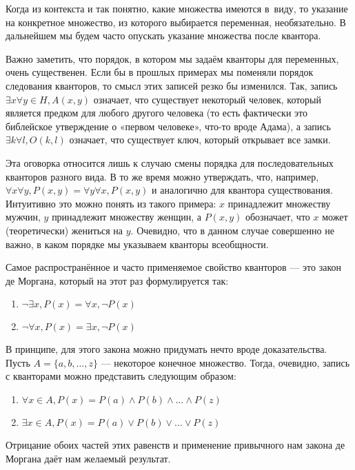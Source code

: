 Когда из контекста и так понятно, какие множества имеются в~виду, то указание на конкретное множество, из которого выбирается переменная, необязательно. В дальнейшем мы будем часто опускать указание множества после квантора.

Важно заметить, что порядок, в котором мы задаём кванторы для переменных, очень существенен. Если бы в прошлых примерах мы поменяли порядок следования кванторов, то смысл этих записей резко бы изменился. Так, запись $\exists x \forall y \in H, A(x, y)$ означает, что существует некоторый человек, который является предком для любого другого человека (то есть фактически это библейское утверждение о «первом человеке», что-то вроде Адама), а запись $\exists k \forall l, O(k, l)$ означает, что существует ключ, который открывает все замки.

Эта оговорка относится лишь к случаю смены порядка для последовательных кванторов разного вида. В то же время можно утверждать, что, например, $\forall x \forall y, P(x, y) = \forall y \forall x, P(x, y)$ и аналогично для квантора существования. Интуитивно это можно понять из такого примера: $x$ принадлежит множеству мужчин, $y$ принадлежит множеству женщин, а $P(x, y)$ обозначает, что $x$ может (теоретически) жениться на $y$. Очевидно, что в данном случае совершенно не важно, в каком порядке мы указываем кванторы всеобщности.

Самое распространённое и часто применяемое свойство кванторов — это закон де Моргана, который на этот раз формулируется так:

\begin{enumerate}
\item   $\neg \exists x, P(x) = \forall x, \neg P(x)$
\item   $\neg \forall x, P(x) = \exists x, \neg P(x)$
\end{enumerate}

В принципе, для этого закона можно придумать нечто вроде доказательства. Пусть $A = \{a, b, \ldots, z\}$ — некоторое конечное множество. Тогда, очевидно, запись с кванторами можно представить  следующим образом:

\begin{enumerate}
\item   $\forall x \in A, P(x) = P(a) \wedge P(b) \wedge \ldots \wedge P(z)$
\item   $\exists x \in A, P(x) = P(a) \vee P(b) \vee \ldots \vee P(z)$
\end{enumerate}

Отрицание обоих частей этих равенств и применение привычного нам закона де Моргана даёт нам желаемый результат.

